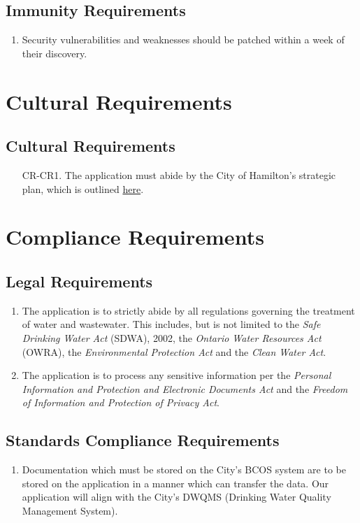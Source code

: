 \documentclass[12pt]{article}
\begin{document}
\subsection{Immunity Requirements}
\begin{enumerate} [{SR-IMR}1.]
  \item Security vulnerabilities and weaknesses should be patched
    within a week of their discovery.
\end{enumerate}

\section{Cultural Requirements}
\subsection{Cultural Requirements}
\begin{enumerate}[{CR-CR}1.]
  \item[CR-CR1.] The application must abide by the City of Hamilton's
    strategic plan, which is outlined
    \href{https://www.hamilton.ca/city-council/plans-strategies/strategies/2016-2025-strategic-plan}{here}.
\end{enumerate}

\section{Compliance Requirements}
\subsection{Legal Requirements}
\begin{enumerate}[{CR-L}1.]
  \item The application is to strictly abide by all regulations governing
    the treatment of water and wastewater. This includes, but is not limited
    to the \textit{Safe Drinking Water Act} (SDWA), 2002, the
    \textit{Ontario Water Resources Act} (OWRA), the
    \textit{Environmental Protection Act} and the \textit{Clean Water Act}.\\
  \item The application is to process any sensitive information per the
    \textit{Personal Information and Protection and Electronic
    Documents Act} and
    the \textit{Freedom of Information and Protection of Privacy Act}.
\end{enumerate}
\subsection{Standards Compliance Requirements}
\begin{enumerate}[{CR-S1}1.]
  \item Documentation which must be stored on the City's BCOS
    system are to be stored on the application in a manner which can
    transfer the data. Our application will align with the City's
    DWQMS (Drinking Water Quality Management System).
\end{enumerate}
\end{document}
